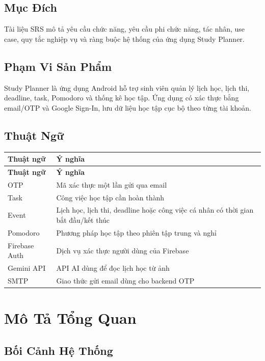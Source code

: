 \documentclass[12pt,a4paper]{report}
\begin{document}
\subsection{Mục Đích}

Tài liệu SRS mô tả yêu cầu chức năng, yêu cầu phi chức năng, tác nhân, use case, quy tắc nghiệp vụ và ràng buộc hệ thống của ứng dụng Study Planner.

\subsection{Phạm Vi Sản Phẩm}

Study Planner là ứng dụng Android hỗ trợ sinh viên quản lý lịch học, lịch thi, deadline, task, Pomodoro và thống kê học tập. Ứng dụng có xác thực bằng email/OTP và Google Sign-In, lưu dữ liệu học tập cục bộ theo từng tài khoản.

\subsection{Thuật Ngữ}

\begin{longtable}{|>{\raggedright\arraybackslash}p{}|>{\raggedright\arraybackslash}p{}|}
\hline
\textbf{Thuật ngữ} & \textbf{Ý nghĩa} \\ \hline
\endfirsthead
\hline
\textbf{Thuật ngữ} & \textbf{Ý nghĩa} \\ \hline
\endhead
OTP & Mã xác thực một lần gửi qua email \\ \hline
Task & Công việc học tập cần hoàn thành \\ \hline
Event & Lịch học, lịch thi, deadline hoặc công việc cá nhân có thời gian bắt đầu/kết thúc \\ \hline
Pomodoro & Phương pháp học tập theo phiên tập trung và nghỉ \\ \hline
Firebase Auth & Dịch vụ xác thực người dùng của Firebase \\ \hline
Gemini API & API AI dùng để đọc lịch học từ ảnh \\ \hline
SMTP & Giao thức gửi email dùng cho backend OTP \\ \hline
\end{longtable}

\section{Mô Tả Tổng Quan}

\subsection{Bối Cảnh Hệ Thống}
\end{document}

